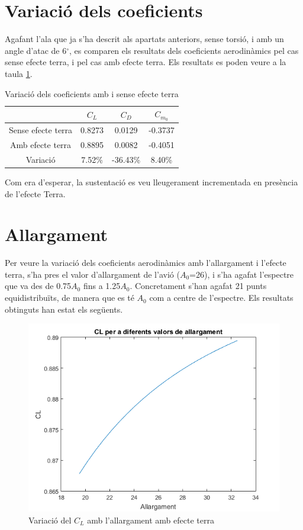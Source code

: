\section{Variació dels coeficients}

Agafant l'ala que ja s'ha descrit als apartats anteriors, sense torsió, i amb un angle d'atac de 6$^{\circ}$, es comparen els resultats dels coeficients aerodinàmics pel cas sense efecte terra, i pel cas amb efecte terra. Els resultats es poden veure a la taula \ref{NoGroundvsGround}.

\begin{table} [H]
	\centering
	\begin{tabular}{| c | c | c | c |}	
		\hline
		& $C_{L}$ & $C_{D}$ & $C_{m_{0}}$ \\
		\hline
		Sense efecte terra & 0.8273 & 0.0129 & -0.3737 \\
		\hline
		Amb efecte terra & 0.8895 & 0.0082 & -0.4051 \\
		\hline	
		Variació & 7.52\% & -36.43\% & 8.40\% \\
		\hline
	\end{tabular}
\caption{Variació dels coeficients amb i sense efecte terra} \label{NoGroundvsGround}
\end{table}
Com era d'esperar, la sustentació es veu lleugerament incrementada en presència de l'efecte Terra.
\section{Allargament}

Per veure la variació dels coeficients aerodinàmics amb l'allargament i l'efecte terra, s'ha pres el valor d'allargament de l'avió ($A_{0}$=26), i s'ha agafat l'espectre que va des de 0.75$A_{0}$ fins a 1.25$A_{0}$. Concretament s'han agafat 21 punts equidistribuïts, de manera que es té $A_{0}$ com a centre de l'espectre. Els resultats obtinguts han estat els següents.

\begin{figure}[H]
	\centering
	\includegraphics[]{./plots/CL_A}
	\caption{Variació del $C_{L}$ amb l'allargament amb efecte terra}
	\label{CL_A}
\end{figure}

